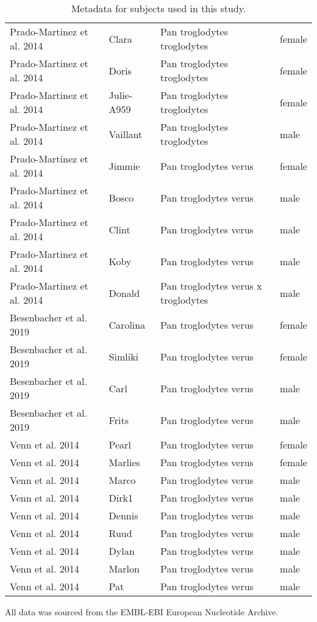 \begin{table}[h]
\begin{tabular}{|l|l|l|l|}
Prado-Martinez et al. 2014  &  Clara  &  Pan troglodytes troglodytes  &  female  \\
Prado-Martinez et al. 2014  &  Doris  &  Pan troglodytes troglodytes  &  female  \\
Prado-Martinez et al. 2014  &  Julie-A959  &  Pan troglodytes troglodytes  &  female  \\
Prado-Martinez et al. 2014  &  Vaillant  &  Pan troglodytes troglodytes  &  male  \\
Prado-Martinez et al. 2014  &  Jimmie  &  Pan troglodytes verus  &  female  \\
Prado-Martinez et al. 2014  &  Bosco  &  Pan troglodytes verus  &  male  \\
Prado-Martinez et al. 2014  &  Clint  &  Pan troglodytes verus  &  male  \\
Prado-Martinez et al. 2014  &  Koby  &  Pan troglodytes verus  &  male  \\
Prado-Martinez et al. 2014  &  Donald  &  Pan troglodytes verus x troglodytes  &  male \\
Besenbacher et al. 2019  &  Carolina  &  Pan troglodytes verus  &  female  \\
Besenbacher et al. 2019  &  Simliki  &  Pan troglodytes verus  &  female  \\
Besenbacher et al. 2019  &  Carl  &  Pan troglodytes verus  &  male  \\
Besenbacher et al. 2019  &  Frits  &  Pan troglodytes verus  &  male  \\
Venn et al. 2014  &  Pearl  &  Pan troglodytes verus  &  female  \\
Venn et al. 2014  &  Marlies  &  Pan troglodytes verus  &  female  \\
Venn et al. 2014  &  Marco  &  Pan troglodytes verus  &  male  \\
Venn et al. 2014  &  Dirk1  &  Pan troglodytes verus  &  male  \\
Venn et al. 2014  &  Dennis  &  Pan troglodytes verus  &  male  \\
Venn et al. 2014  &  Ruud  &  Pan troglodytes verus  &  male  \\
Venn et al. 2014  &  Dylan  &  Pan troglodytes verus  &  male  \\
Venn et al. 2014  &  Marlon  &  Pan troglodytes verus  &  male  \\
Venn et al. 2014  &  Pat  &  Pan troglodytes verus  &  male  \\
\hline

\end{tabular}
\caption{\label{tab:subjects}Metadata for subjects used in this study.}
\end{table}

All data was sourced from the EMBL-EBI European Nucleotide Archive.